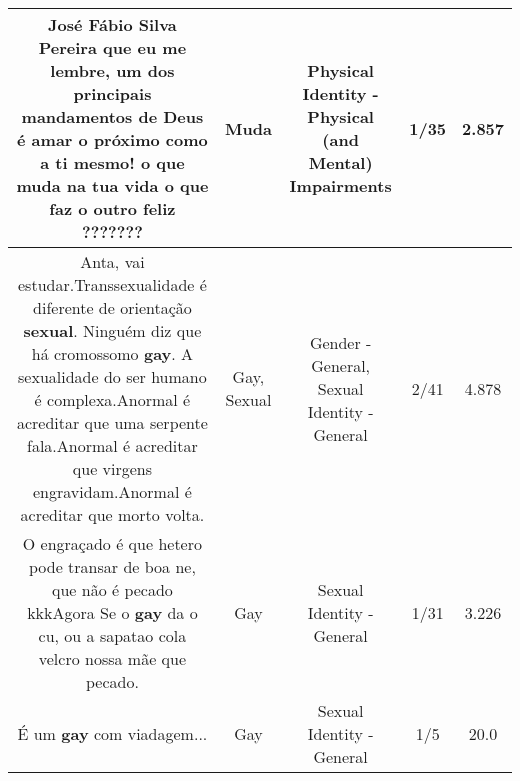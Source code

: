 \documentclass[11pt]{article}
\newlength\mylength
\begin{document}
\begin{center}
\begin{longtable}{|C{.65\mylength}|C{.30\mylength}|C{.12\mylength}|C{.12\mylength}|C{.12\mylength}|}
  \small José Fábio Silva Pereira que eu me lembre, um dos principais mandamentos de Deus é amar o próximo como a ti mesmo! o que \textbf{muda} na tua vida o que faz o outro feliz ???????\normalsize   & Muda & Physical Identity - Physical (and Mental) Impairments & 1/35 & 2.857 \\  \hline
  \small Anta, vai estudar.Transsexualidade é diferente de orientação \textbf{sexual}. Ninguém diz que há cromossomo  \textbf{gay}. A sexualidade do ser humano é complexa.Anormal é acreditar que uma serpente fala.Anormal é acreditar que virgens engravidam.Anormal é acreditar que morto volta.\normalsize   & Gay, Sexual & Gender - General, Sexual Identity - General & 2/41 & 4.878 \\  \hline
  \small O engraçado é que hetero pode transar de boa ne, que não é pecado kkkAgora Se o \textbf{gay} da o cu, ou a sapatao cola velcro nossa mãe que pecado.\normalsize   & Gay & Sexual Identity - General & 1/31 & 3.226 \\  \hline
  \small É um \textbf{gay} com viadagem...\normalsize   & Gay & Sexual Identity - General & 1/5 & 20.0 \\  \hline

\end{longtable}
\end{center}
\end{document}
